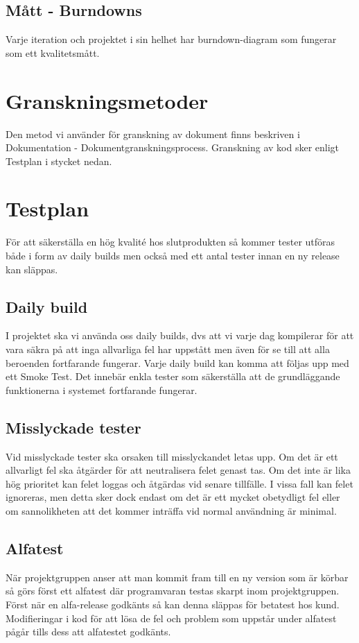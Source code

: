 \subsection{Mått - Burndowns}
Varje iteration och projektet i sin helhet har burndown-diagram som fungerar som ett kvalitetsmått. 

\section{Granskningsmetoder}
Den metod vi använder för granskning av dokument finns beskriven i Dokumentation - Dokumentgranskningsprocess. Granskning av kod sker enligt Testplan i stycket nedan.

\section{Testplan}
För att säkerställa en hög kvalité hos slutprodukten så kommer tester utföras både i form av daily builds men också med ett antal tester innan en ny release kan släppas.

\subsection{Daily build}
I projektet ska vi använda oss daily builds, dvs att vi varje dag kompilerar för att vara säkra på att inga allvarliga fel har uppstått men även för se till att alla beroenden fortfarande fungerar. Varje daily build kan komma att följas upp med ett Smoke Test. Det innebär enkla tester som säkerställa att de grundläggande funktionerna i systemet fortfarande fungerar. 

\subsection{Misslyckade tester}
Vid misslyckade tester ska orsaken till misslyckandet letas upp. Om det är ett allvarligt fel ska åtgärder för att neutralisera felet genast tas. Om det inte är lika hög prioritet kan felet loggas och åtgärdas vid senare tillfälle. I vissa fall kan felet ignoreras, men detta sker dock endast om det är ett mycket obetydligt fel eller om sannolikheten att det kommer inträffa vid normal användning är minimal.

\subsection{Alfatest}
När projektgruppen anser att man kommit fram till en ny version som är körbar så görs först ett alfatest där programvaran testas skarpt inom projektgruppen. Först när en alfa-release godkänts så kan denna släppas för betatest hos kund. Modifieringar i kod för att lösa de fel och problem som uppstår under alfatest pågår tills dess att alfatestet godkänts.

